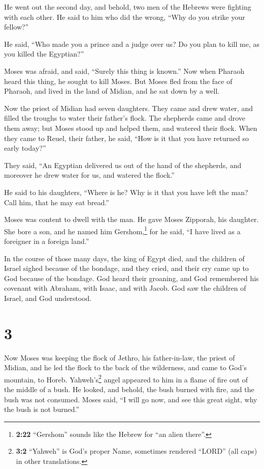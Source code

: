  He went out the second day, and behold, two men of the
Hebrews were fighting with each other. He said to him who did the wrong,
``Why do you strike your fellow?''

 He said, ``Who made you a prince and a judge over us? Do
you plan to kill me, as you killed the Egyptian?''

Moses was afraid, and said, ``Surely this thing is known.''
 Now when Pharaoh heard this thing, he sought to kill
Moses. But Moses fled from the face of Pharaoh, and lived in the land of
Midian, and he sat down by a well.

 Now the priest of Midian had seven daughters. They came
and drew water, and filled the troughs to water their father's flock.
 The shepherds came and drove them away; but Moses stood
up and helped them, and watered their flock.  When they
came to Reuel, their father, he said, ``How is it that you have returned
so early today?''

 They said, ``An Egyptian delivered us out of the hand of
the shepherds, and moreover he drew water for us, and watered the
flock.''

 He said to his daughters, ``Where is he? Why is it that
you have left the man? Call him, that he may eat bread.''

 Moses was content to dwell with the man. He gave Moses
Zipporah, his daughter.  She bore a son, and he named him
Gershom,\footnote{\textbf{2:22} ``Gershom'' sounds like the Hebrew for
  ``an alien there''.} for he said, ``I have lived as a foreigner in a
foreign land.''

 In the course of those many days, the king of Egypt
died, and the children of Israel sighed because of the bondage, and they
cried, and their cry came up to God because of the bondage.
 God heard their groaning, and God remembered his
covenant with Abraham, with Isaac, and with Jacob.  God
saw the children of Israel, and God understood.

\hypertarget{section-2}{%
\section{3}\label{section-2}}

 Now Moses was keeping the flock of Jethro, his
father-in-law, the priest of Midian, and he led the flock to the back of
the wilderness, and came to God's mountain, to Horeb. 
Yahweh's\footnote{\textbf{3:2} ``Yahweh'' is God's proper Name,
  sometimes rendered ``LORD'' (all caps) in other translations.} angel
appeared to him in a flame of fire out of the middle of a bush. He
looked, and behold, the bush burned with fire, and the bush was not
consumed.  Moses said, ``I will go now, and see this great
sight, why the bush is not burned.''

